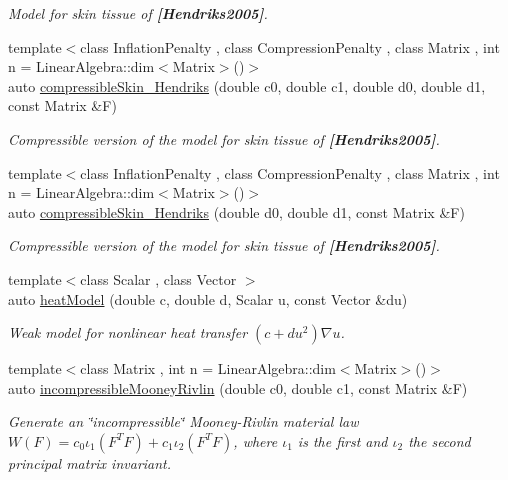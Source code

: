 \begin{DoxyCompactItemize}
\begin{DoxyCompactList}\small\item\em Model for skin tissue of {\bfseries [Hendriks2005]}. \end{DoxyCompactList}\item 
{\footnotesize template$<$class Inflation\+Penalty , class Compression\+Penalty , class Matrix , int n = Linear\+Algebra\+::dim$<$\+Matrix$>$()$>$ }\\auto \hyperlink{group__Biomechanics_ga07b4c52c6ecf7e72f73ab5832fb262cd}{compressible\+Skin\+\_\+\+Hendriks} (double c0, double c1, double d0, double d1, const Matrix \&F)
\begin{DoxyCompactList}\small\item\em Compressible version of the model for skin tissue of {\bfseries [Hendriks2005]}. \end{DoxyCompactList}\item 
{\footnotesize template$<$class Inflation\+Penalty , class Compression\+Penalty , class Matrix , int n = Linear\+Algebra\+::dim$<$\+Matrix$>$()$>$ }\\auto \hyperlink{group__Biomechanics_ga42721e772b7eada1b0bca98247ad440f}{compressible\+Skin\+\_\+\+Hendriks} (double d0, double d1, const Matrix \&F)
\begin{DoxyCompactList}\small\item\em Compressible version of the model for skin tissue of {\bfseries [Hendriks2005]}. \end{DoxyCompactList}\item 
{\footnotesize template$<$class Scalar , class Vector $>$ }\\auto \hyperlink{namespaceFunG_aab17a1468e61f58564333b3fcd7900d6}{heat\+Model} (double c, double d, Scalar u, const Vector \&du)
\begin{DoxyCompactList}\small\item\em Weak model for nonlinear heat transfer $ (c+du^2)\nabla u $. \end{DoxyCompactList}\item 
{\footnotesize template$<$class Matrix , int n = Linear\+Algebra\+::dim$<$\+Matrix$>$()$>$ }\\auto \hyperlink{group__Rubber_gace19173e33490aadd36ae3a03fd1d85c}{incompressible\+Mooney\+Rivlin} (double c0, double c1, const Matrix \&F)
\begin{DoxyCompactList}\small\item\em Generate an \char`\"{}incompressible\char`\"{} Mooney-\/\+Rivlin material law $ W(F)=c_0\iota_1(F^T F) + c_1\iota_2(F^T F) $, where $\iota_1$ is the first and $\iota_2$ the second principal matrix invariant. \end{DoxyCompactList}\item 

\end{DoxyCompactItemize}
